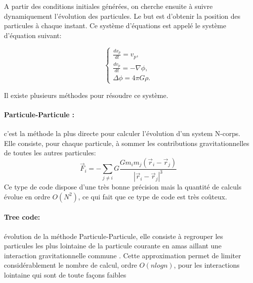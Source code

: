 A partir des conditions initiales générées, on cherche ensuite à suivre dynamiquement l'évolution des particules.
Le but est d'obtenir la position des particules à chaque instant.
Ce système d'équations est appelé le système d'équation suivant:

\begin{equation}
\begin{cases}
\frac{d{x}_p}{dt} = { v}_p, \\
\frac{d{ v}_p}{dt} = -\nabla \phi , \\
\Delta \phi= 4\pi G \rho.
\end{cases}
\label{eq:Ncorps}
\end{equation}

Il existe plusieurs méthodes pour résoudre ce système.
\paragraph{Particule-Particule : } c'est la méthode la plus directe pour calculer l'évolution d'un system N-corps. 
Elle consiste, pour chaque particule, à sommer les contributions gravitationnelles de toutes les autres particules:
\begin{equation}
\vec{F}_i=-\sum_{j\neq i} G \frac{G m_i m_j(\vec{r}_i - \vec{r}_j) }{ |\vec{r}_i - \vec{r}_j |^3}
\end{equation}
Ce type de code dispose d'une très bonne précision mais la quantité de calculs évolue en ordre $O(N^2)$, ce qui fait que ce type de code est très coûteux.

\paragraph{Tree code: } évolution de la méthode Particule-Particule, elle consiste à regrouper les particules les plus lointaine de la particule courante en amas aillant une interaction gravitationnelle commune \citep{1986Natur.324..446B}.
Cette approximation permet de limiter considérablement le nombre de calcul, ordre $O(n log n)$, pour les interactions lointaine qui sont de toute façons faibles 



%


